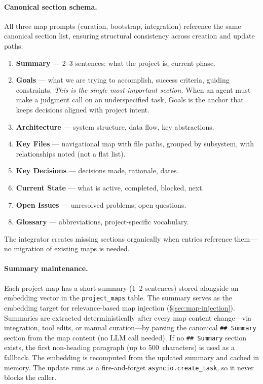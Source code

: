 \documentclass[11pt,a4paper]{article}
\newcommand{\code}[1]{\texttt{#1}}
\begin{document}
\paragraph{Canonical section schema.}
All three map prompts (curation, bootstrap, integration) reference the
same canonical section list, ensuring structural consistency across
creation and update paths:
\begin{enumerate}[nosep]
  \item \textbf{Summary} --- 2--3 sentences: what the project is, current phase.
  \item \textbf{Goals} --- what we are trying to accomplish, success criteria,
        guiding constraints. \emph{This is the single most important section.}
        When an agent must make a judgment call on an underspecified task,
        Goals is the anchor that keeps decisions aligned with project intent.
  \item \textbf{Architecture} --- system structure, data flow, key abstractions.
  \item \textbf{Key Files} --- navigational map with file paths, grouped by
        subsystem, with relationships noted (not a flat list).
  \item \textbf{Key Decisions} --- decisions made, rationale, dates.
  \item \textbf{Current State} --- what is active, completed, blocked, next.
  \item \textbf{Open Issues} --- unresolved problems, open questions.
  \item \textbf{Glossary} --- abbreviations, project-specific vocabulary.
\end{enumerate}
The integrator creates missing sections organically when entries reference
them---no migration of existing maps is needed.

\paragraph{Summary maintenance.}
Each project map has a short summary (1--2 sentences) stored alongside
an embedding vector in the \code{project\_maps} table. The summary
serves as the embedding target for relevance-based map injection
(\S\ref{sec:map-injection}). Summaries are extracted deterministically
after every map content change---via integration, tool edits, or manual
curation---by parsing the canonical \code{\#\# Summary} section from the
map content (no LLM call needed). If no \code{\#\# Summary} section
exists, the first non-heading paragraph (up to 500~characters) is used as
a fallback. The embedding is recomputed from the updated summary and
cached in memory. The update runs as a fire-and-forget
\code{asyncio.create\_task}, so it never blocks the caller.
\end{document}
